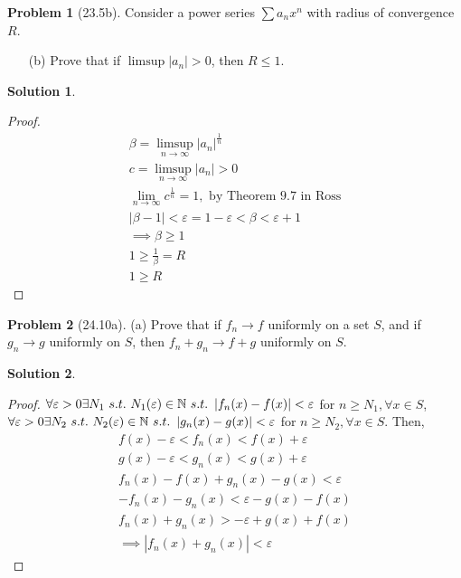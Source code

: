 \documentclass[12pt]{article}
\theoremstyle{definition} %
\newtheorem{solution}{Solution}
\newtheorem{problem}{Problem}
\theoremstyle{plain} %
\begin{document}
\begin{problem}[23.5b]
    Consider a power series $ \sum a_n x^n $ with radius of convergence $ R $.
\begin{enumerate}
    \item[(b)] Prove that if $ \limsup |a_n| > 0 $, then $ R \leq 1 $.
\end{enumerate}
\end{problem}
\begin{solution}
\begin{proof}
    \begin{align}
    \beta = \limsup_{n \to \infty} \left\vert a_{n} \right\vert^{\frac{1}{n}}\\[10pt] 
    c = \limsup_{n \to \infty} \left\vert a_{n} \right\vert>0\\[10pt] 
    \lim_{n \to \infty}c^{\frac{1}{n}} = 1, \text{ by Theorem 9.7 in Ross} \\[10pt] 
    \left\vert \beta-1 \right\vert <\varepsilon= 1-\varepsilon < \beta <\varepsilon+1 \\[10pt] 
    \implies \beta\geq 1\\[10pt] 
    1\geq \frac{1}{\beta}=R \\[10pt] 
    1\geq R
\end{align}
\end{proof} 
\end{solution}
\begin{problem}[24.10a]
    (a) Prove that if $ f_n \to f $ uniformly on a set $ S $, and if $ g_n \to g $ uniformly on $ S $, then $ f_n + g_n \to f + g $ uniformly on $ S $.
\end{problem}
\begin{solution}
    \begin{proof}
        $\forall \varepsilon>0 \exists N_1 \ s.t. \ N_1(\varepsilon)\in \mathbb{\MakeUppercase{n}} \ s.t. \ \left\vert f_n(x)-f(x) \right\vert<\varepsilon $ for $n\geq N_1, \forall x\in S$, 
    $\forall \varepsilon>0 \exists N_2 \ s.t. \ N_2(\varepsilon)\in \mathbb{\MakeUppercase{n}} \ s.t. \ \left\vert g_n(x)-g(x) \right\vert<\varepsilon $ for $n\geq N_2, \forall x\in S$. Then,
    \begin{align}
        f(x)-\varepsilon<f_{n}(x)<f(x)+\varepsilon \\[10pt] 
        g(x)-\varepsilon<g_{n}(x)<g(x)+\varepsilon \\[10pt]
        f_{n}(x)-f(x)+g_{n}(x)-g(x)<\varepsilon \\[10pt] 
        -f_{n}(x)-g_{n}(x)<\varepsilon-g(x)-f(x) \\[10pt] 
        f_{n}(x)+g_{n}(x)>-\varepsilon+g(x)+f(x) \\[10pt] 
        \implies \left\vert f_{n}(x)+g_{n}(x) \right\vert <\varepsilon
    \end{align}
    \end{proof}
\end{solution}
\end{document}
